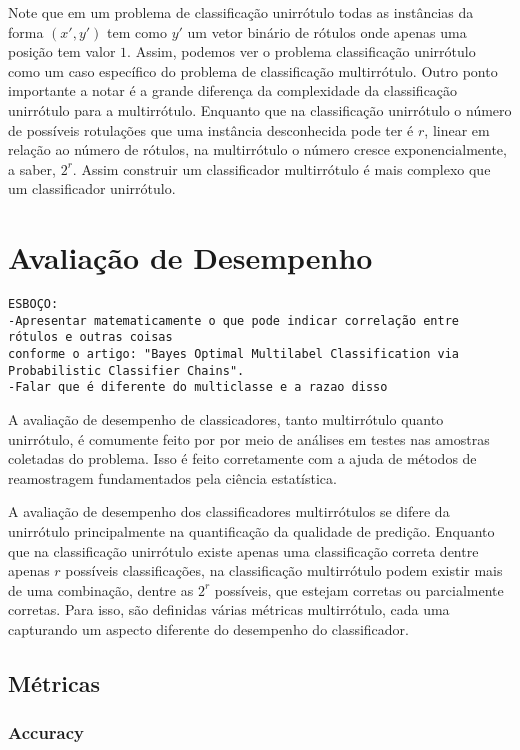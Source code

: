 Note que em um problema de classificação unirrótulo todas as instâncias da forma $(x',y')$ tem como $y'$
um vetor binário de rótulos onde apenas uma posição tem valor $1$. Assim, podemos ver o problema classificação
unirrótulo como um caso específico do problema de classificação multirrótulo.
Outro ponto importante a notar é a grande diferença da complexidade da classificação unirrótulo para a multirrótulo.
Enquanto que na classificação unirrótulo o número de possíveis rotulações que uma instância desconhecida pode ter é
$r$, linear em relação ao número de rótulos, na multirrótulo o número cresce exponencialmente, a saber, $2^r$.
Assim construir um classificador multirrótulo é mais complexo que um classificador unirrótulo.



\section{Avaliação de Desempenho}
\begin{verbatim}
ESBOÇO:
-Apresentar matematicamente o que pode indicar correlação entre rótulos e outras coisas
conforme o artigo: "Bayes Optimal Multilabel Classification via Probabilistic Classifier Chains".
-Falar que é diferente do multiclasse e a razao disso
\end{verbatim}

A avaliação de desempenho de classicadores, tanto multirrótulo quanto unirrótulo, é comumente feito por
por meio de análises em testes nas amostras coletadas
do problema. Isso é feito corretamente com a ajuda de métodos de reamostragem fundamentados pela ciência estatística.

A avaliação de desempenho dos classificadores multirrótulos se difere da unirrótulo principalmente na
quantificação da qualidade de predição. Enquanto que na classificação unirrótulo existe apenas uma classificação
correta dentre apenas $r$ possíveis classificações, na classificação multirrótulo podem existir mais de uma combinação, 
dentre as $2^r$ possíveis, que estejam corretas ou parcialmente corretas. Para isso, são definidas várias métricas multirrótulo,
cada uma capturando um aspecto diferente do desempenho do classificador. 






\subsection{Métricas}
\label{sec:metrics}
\subsubsection{Accuracy}
